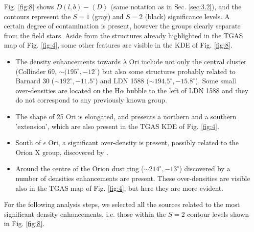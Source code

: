 \documentclass[onecolumn]{aa} %
\begin{document}
Fig. \ref{fig:8} shows $D(l, b) - \left\langle D \right\rangle$ (same notation as in Sec. \ref{sec:3.2}), and the contours represent the $S = 1$ (gray) and $S = 2$ (black) significance levels. A certain degree of contamination is present, however the groups clearly separate from the field stars.
Aside from the structures already highlighted in the TGAS map of Fig. \ref{fig:4}, some other features are visible in the KDE of Fig. \ref{fig:8}.

\begin{itemize}
\item The density enhancements towards $\lambda$ Ori include not only the central cluster (Collinder 69, $\sim (195^{\circ}, -12^{\circ}$) but also  some structures probably related to Barnard 30 ($\sim 192^{\circ}, -11.5^{\circ}$) and LDN 1588 ($\sim 194.5^{\circ}, -15.8^{\circ}$). Some small over-densities are located on the H$\alpha$ bubble to the left of LDN 1588 and they do not correspond to any  previously known group.

\item The shape of 25 Ori is elongated, and presents a northern and a southern 'extension', which are also present in the TGAS KDE of Fig. \ref{fig:4}.

\item South of $\epsilon$ Ori, a significant over-density is present, possibly related to the Orion X group, discovered by \cite{Bouy2015}.

\item Around the centre of the Orion dust ring ($\sim 214^{\circ}, -13^{\circ}$) discovered by \cite{Schlafly2015} a number of densities enhancements are present. These over-densities are visible also in the TGAS map of Fig. \ref{fig:4}, but here they are more evident.
\end{itemize}

\noindent
For the following analysis steps, we selected all the sources related to the most significant density enhancements, i.e. those within the $S = 2$ contour levels shown in Fig. \ref{fig:8}. 
\end{document}

